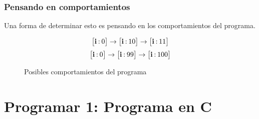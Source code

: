 \documentclass{beamer}
\begin{document}
\begin{frame}[fragile]
  \frametitle{Pensando en comportamientos}

  Una forma de determinar esto es pensando en los comportamientos del programa.

  \begin{figure}
    \begin{center}
      \begin{equation*}
        \begingroup
        \setlength\arraycolsep{1pt}
        \begin{aligned}
          \begin{bmatrix*}
            \textbf{i} &:& 0
          \end{bmatrix*}
          \rightarrow
          \begin{bmatrix*}
            \textbf{i} &:& 10
          \end{bmatrix*}
          \rightarrow
          \begin{bmatrix*}
            \textbf{i} &:& 11
          \end{bmatrix*}
        \end{aligned}
        \endgroup
      \end{equation*}
      \pause
      \begin{equation*}
        \begingroup
        \setlength\arraycolsep{1pt}
        \begin{aligned}
          \begin{bmatrix*}
            \textbf{i} &:& 0
          \end{bmatrix*}
          \rightarrow
          \begin{bmatrix*}
            \textbf{i} &:& 99
          \end{bmatrix*}
          \rightarrow
          \begin{bmatrix*}
            \textbf{i} &:& 100
          \end{bmatrix*}
        \end{aligned}
        \endgroup
      \end{equation*}
    \end{center}

    \caption{Posibles comportamientos del programa}
    \label{lst:cprogram_behavior}
  \end{figure}

\end{frame}

\section{Programar 1: Programa en C}
\end{document}
